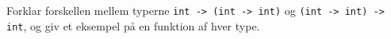 Forklar forskellen mellem typerne \lstinline{int -> (int -> int)} og \lstinline{(int -> int) -> int}, og giv et eksempel på en funktion af hver type.
